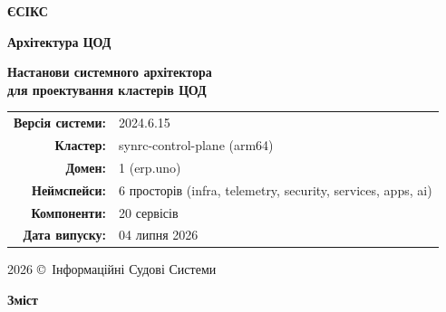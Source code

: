 \documentclass{article}
\newcommand\HUGE[1]{\fontsize{38}{38}\selectfont #1}
\begin{document}
\pagestyle{fancy}

\begin{titlepage}
\AddToShipoutPictureBG*{\AtPageLowerLeft{\color{primary}\rule{\paperwidth}{\paperheight}}}
\color{white}\thispagestyle{empty}\vspace*{3cm}\centering
  {\Huge \textbf{ЄСІКС} \par} \vspace{1.5cm}
  {\HUGE \textbf{Архітектура ЦОД} \par} \vspace{2cm}
  {\LARGE \textbf{Настанови системного архітектора \\для проектування кластерів ЦОД} \par}
  \vspace{1.5cm}
  \begin{tabular}{rl}
    \textbf{Версія системи:}  & 2024.6.15 \\[4pt]
    \textbf{Кластер:}         & synrc-control-plane (arm64) \\[4pt]
    \textbf{Домен:}           & 1 (erp.uno)\\[4pt]
    \textbf{Неймспейси:}      & 6 просторів (infra, telemetry, security, services, apps, ai) \\[4pt]
    \textbf{Компоненти:}      & 20 сервісів \\[4pt]
    \textbf{Дата випуску:}    & 04 липня 2026 \\
  \end{tabular}
\vfill
  {\large 2026 \copyright\ Інформаційні Судові Системи \par}
\end{titlepage}

\newpage
\begin{center}
  {\Huge\color{primary}\bfseries Зміст\par}
\end{center}
\vspace{40pt}
\tableofcontents

\begin{abstract}
Технічний блюпрінт ЦОД.
\end{abstract}
\end{document}
